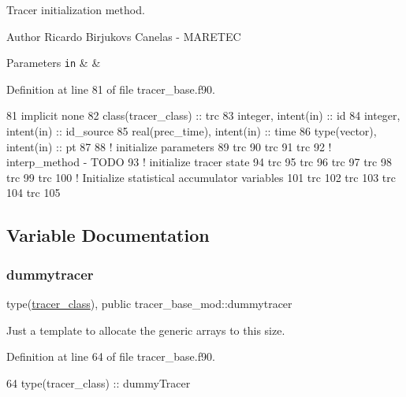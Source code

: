 Tracer initialization method. 

\begin{DoxyAuthor}{Author}
Ricardo Birjukovs Canelas -\/ M\+A\+R\+E\+T\+EC
\end{DoxyAuthor}

\begin{DoxyParams}[1]{Parameters}
\mbox{\tt in}  & {\em } & \\
\hline
\end{DoxyParams}


Definition at line 81 of file tracer\+\_\+base.\+f90.


\begin{DoxyCode}
81     \textcolor{keywordtype}{implicit none}
82     \textcolor{keywordtype}{class}(tracer\_class) :: trc
83     \textcolor{keywordtype}{integer}, \textcolor{keywordtype}{intent(in)} :: id
84     \textcolor{keywordtype}{integer}, \textcolor{keywordtype}{intent(in)} :: id\_source
85     \textcolor{keywordtype}{real(prec\_time)}, \textcolor{keywordtype}{intent(in)} :: time
86     \textcolor{keywordtype}{type}(vector), \textcolor{keywordtype}{intent(in)} :: pt
87 
88     \textcolor{comment}{! initialize parameters}
89     trc%
90     trc%
91     trc%
92     \textcolor{comment}{! interp\_method - TODO}
93     \textcolor{comment}{! initialize tracer state}
94     trc%
95     trc%
96     trc%
97     trc%
98     trc%
99     trc%
100     \textcolor{comment}{! Initialize statistical accumulator variables}
101     trc%
102     trc%
103     trc%
104     trc%
105 
\end{DoxyCode}


\subsection{Variable Documentation}
\mbox{\label{namespacetracer__base__mod_a6e04d44b4ef46cf27fb0e38290a98c14}} 
\subsubsection{\texorpdfstring{dummytracer}{dummytracer}}
{\footnotesize\ttfamily type(\mbox{\hyperlink{structtracer__base__mod_1_1tracer__class}{tracer\+\_\+class}}), public tracer\+\_\+base\+\_\+mod\+::dummytracer}



Just a template to allocate the generic arrays to this size. 



Definition at line 64 of file tracer\+\_\+base.\+f90.


\begin{DoxyCode}
64     \textcolor{keywordtype}{type}(tracer\_class) :: dummyTracer
\end{DoxyCode}
